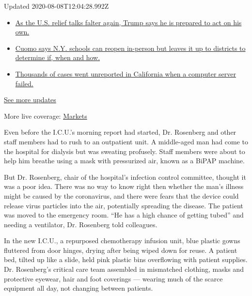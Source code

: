 Updated 2020-08-08T12:04:28.992Z

\begin{itemize}
\tightlist
\item
  \href{https://www.nytimes.com/2020/08/07/world/covid-19-news.html?action=click\&pgtype=Article\&state=default\&region=MAIN_CONTENT_1\&context=storylines_live_updates\#link-1f86d03a}{As
  the U.S. relief talks falter again, Trump says he is prepared to act
  on his own.}
\item
  \href{https://www.nytimes.com/2020/08/07/world/covid-19-news.html?action=click\&pgtype=Article\&state=default\&region=MAIN_CONTENT_1\&context=storylines_live_updates\#link-3f64a70a}{Cuomo
  says N.Y. schools can reopen in-person but leaves it up to districts
  to determine if, when and how.}
\item
  \href{https://www.nytimes.com/2020/08/07/world/covid-19-news.html?action=click\&pgtype=Article\&state=default\&region=MAIN_CONTENT_1\&context=storylines_live_updates\#link-14e70066}{Thousands
  of cases went unreported in California when a computer server failed.}
\end{itemize}

\href{https://www.nytimes.com/2020/08/07/world/covid-19-news.html?action=click\&pgtype=Article\&state=default\&region=MAIN_CONTENT_1\&context=storylines_live_updates}{See
more updates}

More live coverage:
\href{https://www.nytimes.com/live/2020/08/07/business/stock-market-today-coronavirus?action=click\&pgtype=Article\&state=default\&region=MAIN_CONTENT_1\&context=storylines_live_updates}{Markets}

Even before the I.C.U.'s morning report had started, Dr. Rosenberg and
other staff members had to rush to an outpatient unit. A middle-aged man
had come to the hospital for dialysis but was sweating profusely. Staff
members were about to help him breathe using a mask with pressurized
air, known as a BiPAP machine.

But Dr. Rosenberg, chair of the hospital's infection control committee,
thought it was a poor idea. There was no way to know right then whether
the man's illness might be caused by the coronavirus, and there were
fears that the device could release virus particles into the air,
potentially spreading the disease. The patient was moved to the
emergency room. ``He has a high chance of getting tubed'' and needing a
ventilator, Dr. Rosenberg told colleagues.

In the new I.C.U., a repurposed chemotherapy infusion unit, blue plastic
gowns fluttered from door hinges, drying after being wiped down for
reuse. A patient bed, tilted up like a slide, held pink plastic bins
overflowing with patient supplies. Dr. Rosenberg's critical care team
assembled in mismatched clothing, masks and protective eyewear, hair and
foot coverings --- wearing much of the scarce equipment all day, not
changing between patients.

